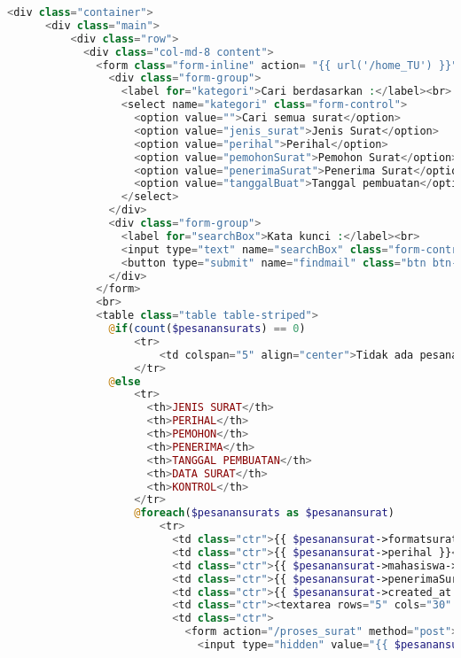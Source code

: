 \begin{lstlisting}[language=php,basicstyle=\tiny,caption=\textit{Home} TU]
    <div class="container">
      <div class="main">
          <div class="row">
            <div class="col-md-8 content">
              <form class="form-inline" action= "{{ url('/home_TU') }}" method="get">
                <div class="form-group">
                  <label for="kategori">Cari berdasarkan :</label><br>
                  <select name="kategori" class="form-control">
                    <option value="">Cari semua surat</option>
                    <option value="jenis_surat">Jenis Surat</option>
                    <option value="perihal">Perihal</option>
                    <option value="pemohonSurat">Pemohon Surat</option>
                    <option value="penerimaSurat">Penerima Surat</option>
                    <option value="tanggalBuat">Tanggal pembuatan</option>
                  </select>
                </div>
                <div class="form-group">
                  <label for="searchBox">Kata kunci :</label><br>
                  <input type="text" name="searchBox" class="form-control" size="69" />
                  <button type="submit" name="findmail" class="btn btn-primary">Cari surat</button>
                </div>
              </form>
              <br>
              <table class="table table-striped">
                @if(count($pesanansurats) == 0)
                    <tr>
                        <td colspan="5" align="center">Tidak ada pesanan surat ...</td>
                    </tr>
                @else
                    <tr>
                      <th>JENIS SURAT</th>
                      <th>PERIHAL</th>
                      <th>PEMOHON</th>
                      <th>PENERIMA</th>
                      <th>TANGGAL PEMBUATAN</th>
                      <th>DATA SURAT</th>
                      <th>KONTROL</th>
                    </tr>
                    @foreach($pesanansurats as $pesanansurat)
                        <tr>
                          <td class="ctr">{{ $pesanansurat->formatsurat->jenis_surat }}</td>
                          <td class="ctr">{{ $pesanansurat->perihal }}</td>
                          <td class="ctr">{{ $pesanansurat->mahasiswa->nama_mahasiswa }}</td>
                          <td class="ctr">{{ $pesanansurat->penerimaSurat }}</td>
                          <td class="ctr">{{ $pesanansurat->created_at }}</td>
                          <td class="ctr"><textarea rows="5" cols="30" style="border: none" readonly>{{ $pesanansurat->dataSurat }}</textarea></td>
                          <td class="ctr">
                            <form action="/proses_surat" method="post">
                              <input type="hidden" value="{{ $pesanansurat->id }}" name="id">

\end{lstlisting}

